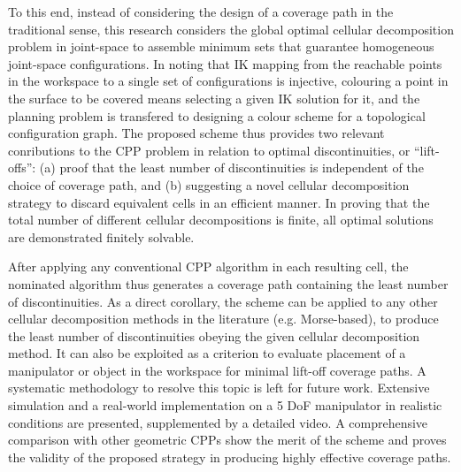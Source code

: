 \documentclass[journal]{IEEEtran}
\begin{document}
To this end, instead of considering the design of a coverage path in the traditional sense, this research considers the global optimal cellular decomposition problem in joint-space to assemble minimum sets that guarantee homogeneous joint-space configurations. In noting that IK mapping from the reachable points in the workspace to a single set of configurations is injective, 
colouring a point in the surface to be covered means selecting a given IK solution for it, and the planning problem is transfered to designing a colour scheme for a topological configuration graph. %
The proposed scheme thus provides two relevant conributions to the CPP problem in relation to optimal discontinuities, or ``lift-offs'':  
(a) proof that the least number of discontinuities is independent of the choice of coverage path, and (b) suggesting a novel cellular decomposition strategy to discard equivalent cells in an efficient manner. In proving 
that the total number of different cellular decompositions is finite, all optimal solutions are demonstrated finitely solvable. 

After applying any conventional CPP algorithm in each resulting cell, the nominated algorithm thus generates a coverage path containing the least number of discontinuities. As a direct corollary, the scheme can be applied to any other cellular decomposition methods in the literature (e.g. Morse-based), to produce the least number of discontinuities obeying the given cellular decomposition method. It can also be exploited as a criterion to evaluate placement of a manipulator or object in the workspace for minimal lift-off coverage paths. A systematic methodology to resolve this topic is left for future work.
Extensive simulation and a real-world implementation on a 5 DoF manipulator in realistic conditions are presented, supplemented by a detailed video. 
A comprehensive comparison with other geometric CPPs show the merit of the scheme and proves the validity of the proposed strategy in producing highly effective coverage paths.
\end{document}
